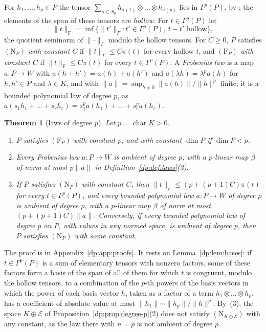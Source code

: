 \documentclass[11pt]{amsart}
\newtheorem{theorem}{Theorem}[section]
\theoremstyle{definition}
\theoremstyle{remark}
\numberwithin{equation}{section}
\newcommand{\norm}[1]{\lVert #1\rVert}
\theoremstyle{plain}
\theoremstyle{definition}
\theoremstyle{plain}
\begin{document}
For $h_1,\dots,h_p\in P$ the tensor $\sum_{\sigma\in S_p}h_{\sigma(1)}\otimes\dots\otimes h_{\sigma(p)}$ lies in $\Gamma^p(P)$, by \cite[(4.2)]{I}; the elements of the span of these tensors are \emph{hollow}. For $t\in\Gamma^p(P)$ let
\[
 \norm t_{\mathrm F}=\inf\{\norm{t'}_\Gamma:t'\in\Gamma^p(P),\ t-t'\text{ hollow}\},
\]
the quotient seminorm of $\norm\cdot_\Gamma$ modulo the hollow tensors. For $C\ge0$, $P$ satisfies \emph{$(\mathrm N_P)$ with constant $C$} if $\norm t_\Gamma\le C\pi(t)$ for every hollow $t$, and \emph{$(\mathrm F_P)$ with constant $C$} if $\norm t_{\mathrm F}\le C\pi(t)$ for every $t\in\Gamma^p(P)$. A \emph{Frobenius law} is a map $a\colon P\to W$ with $a(h+h')=a(h)+a(h')$ and $a(\lambda h)=\lambda^pa(h)$ for $h,h'\in P$ and $\lambda\in K$, and with $\norm a=\sup_{h\ne0}\norm{a(h)}/\norm h^p$ finite; it is a bounded polynomial law of degree $p$, as $a(s_1h_1+\dots+s_rh_r)=s_1^pa(h_1)+\dots+s_r^pa(h_r)$.

\begin{theorem}[laws of degree $p$]\label{dp:thm:frobenius}
Let $p=\operatorname{char}K>0$.
\begin{enumerate}
\item $P$ satisfies $(\mathrm F_P)$ with constant $p$, and with constant $\dim P$ if $\dim P<p$.
\item Every Frobenius law $a\colon P\to W$ is ambient of degree $p$, with a $p$\nobreakdash-linear map $\beta$ of norm at most $p\norm a$ in Definition~\ref{dp:def:laws}(2).
\item If $P$ satisfies $(\mathrm N_P)$ with constant $C$, then $\norm t_\Gamma\le(p+(p+1)C)\pi(t)$ for every $t\in\Gamma^p(P)$, and every bounded polynomial law $a\colon P\to W$ of degree $p$ is ambient of degree $p$, with a $p$\nobreakdash-linear map $\beta$ of norm at most $(p+(p+1)C)\norm a$. Conversely, if every bounded polynomial law of degree $p$ on $P$, with values in any normed space, is ambient of degree $p$, then $P$ satisfies $(\mathrm N_P)$ with some constant.
\end{enumerate}
\end{theorem}
The proof is in Appendix~\ref{dp:app:proofs}. It rests on Lemma~\ref{dp:lem:bases}: if $t\in\Gamma^p(P)$ is a sum of elementary tensors with nonzero factors, some of these factors form a basis of the span of all of them for which $t$ is congruent, modulo the hollow tensors, to a combination of the $p$-th powers of the basis vectors in which the power of each basis vector $h$, taken as a factor of a term $h_1\otimes\dots\otimes h_p$, has a coefficient of absolute value at most $\norm{h_1}\cdots\norm{h_p}/\norm h^p$. By~(3), the space $K\oplus\mathcal E$ of Proposition~\ref{dp:prop:degree-p}(2) does not satisfy $(\mathrm N_{K\oplus\mathcal E})$ with any constant, as the law there with $n=p$ is not ambient of degree $p$.
\end{document}
